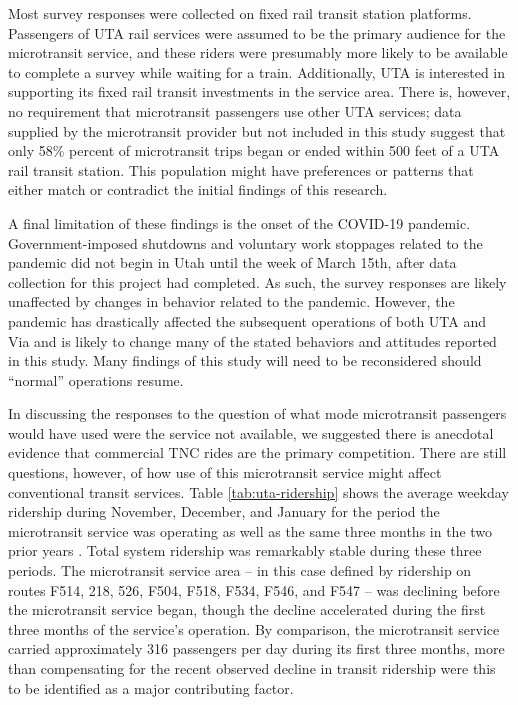 \documentclass[smartcities,article,submit,moreauthors,pdftex]{Definitions/mdpi}
\begin{document}
Most survey responses were collected on fixed rail transit station platforms. Passengers of UTA rail services were assumed to be the primary audience for the microtransit service, and these riders were presumably more likely to be available to complete a survey while waiting for a train. Additionally, UTA is interested in supporting its fixed rail transit investments in the service area. There is, however, no requirement that microtransit passengers use other UTA services; data supplied by the microtransit provider but not included in this study suggest that only 58\% percent of microtransit trips began or ended within 500 feet of a UTA rail transit station. This population might have preferences or patterns that either match or contradict the initial findings of this research.

A final limitation of these findings is the onset of the COVID-19 pandemic. Government-imposed shutdowns and voluntary work stoppages related to the pandemic did not begin in Utah until the week of March 15th, after data collection for this project had completed. As such, the survey responses are likely unaffected by changes in behavior related to the pandemic. However, the pandemic has drastically affected the subsequent operations of both UTA and Via and is likely to change many of the stated behaviors and attitudes reported in this study. Many findings of this study will need to be reconsidered should “normal” operations resume.

In discussing the responses to the question of what mode microtransit passengers would have used were the service not available, we suggested there is anecdotal evidence that commercial TNC rides are the primary competition. There are still questions, however, of how use of this microtransit service might affect conventional transit services. Table \ref{tab:uta-ridership} shows the average weekday ridership during November, December, and January for the period the microtransit service was operating as well as the same three months in the two prior years \citep{uta2020boardings}. Total system ridership was remarkably stable during these three periods. The microtransit service area -- in this case defined by ridership on routes F514, 218, 526, F504, F518, F534, F546, and F547 -- was declining before the microtransit service began, though the decline accelerated during the first three months of the service’s operation. By comparison, the microtransit service carried approximately 316 passengers per day during its first three months, more than compensating for the recent observed decline in transit ridership were this to be identified as a major contributing factor.
\end{document}
